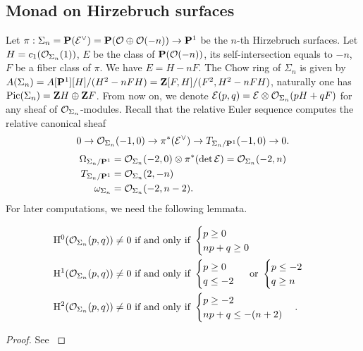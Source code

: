 \documentclass[../main.tex]{subfiles}
\begin{document}
\subsection{Monad on Hirzebruch surfaces}
Let $\pi: \Sigma_{n}=\mathbf{P}(\mathcal{E}^{\vee})=\mathbf{P}(\mathcal{O}\oplus \mathcal{O}(-n))\rightarrow \mathbf{P}^1$ be the $n$-th Hirzebruch surfaces.  Let $H=c_{1}(\mathcal{O}_{\Sigma_{n}}(1))$, $E$ be the class of $\mathbf{P}(\mathcal{O}(-n))$, its self-intersection equals to $-n$, $F$ be a fiber class of $\pi$. We have $E=H-nF$. The Chow ring of $\Sigma_{n}$ is given by $A(\Sigma_{n})=A[\mathbf{P}^1][H]/(H^{2}-nFH)=\mathbf{Z}[F, H]/(F^2, H^{2}-nFH)$, naturally one has $\operatorname{Pic}(\Sigma_{n})=\mathbf{Z} H\oplus \mathbf{Z} F$. From now on, we denote $\mathcal{E}(p,q)=\mathcal{E}\otimes\mathcal{O}_{\Sigma_{n}}(pH+qF)$ for any sheaf of $\mathcal{O}_{\Sigma_{n}}$-modules. Recall that the relative Euler sequence computes the relative canonical sheaf
$$0\rightarrow \mathcal{O}_{\Sigma_{n}}(-1, 0)\rightarrow \pi^{*}(\mathcal{E}^{\vee})\rightarrow T_{\Sigma_{n}/\mathbf{P}^1}(-1,0)\rightarrow 0.$$
\begin{align*}\Omega_{\Sigma_{n}/\mathbf{P}^1}&=\mathcal{O}_{\Sigma_{n}}(-2, 0)\otimes \pi^{*}(\det \mathcal{E})=\mathcal{O}_{\Sigma_{n}}(-2,n)\\
T_{\Sigma_{n}/\mathbf{P}^1}&=\mathcal{O}_{\Sigma_{n}}(2,-n)\\
\omega_{\Sigma_{n}}&=\mathcal{O}_{\Sigma_{n}}(-2, n-2).\end{align*}
For later computations, we need the following lemmata.
\begin{lemma}\label{Cohomology on the surface}
\begin{align*}
\mathrm{H}^{0}(\mathcal{O}_{\Sigma_{n}}(p, q))&\neq 0 \text{ if and only if }\begin{cases}p\geq 0\\ np+q\geq 0\end{cases}\\
\mathrm{H}^{1}(\mathcal{O}_{\Sigma_{n}}(p, q))&\neq 0  \text{ if and only if }  \begin{cases}p\geq 0\\ q\leq -2\end{cases} \text{ or }  \begin{cases}p\leq -2\\q\geq n\end{cases}\\
\mathrm{H}^{2}(\mathcal{O}_{\Sigma_{n}}(p, q))&\neq 0 \text{ if and only if }\begin{cases}p\geq -2\\ np+q\leq -(n+2)\end{cases}.
\end{align*}
\end{lemma}
\begin{proof}
See \cite[Lemma 3.1]{Monad15}
\end{proof}
\end{document}
